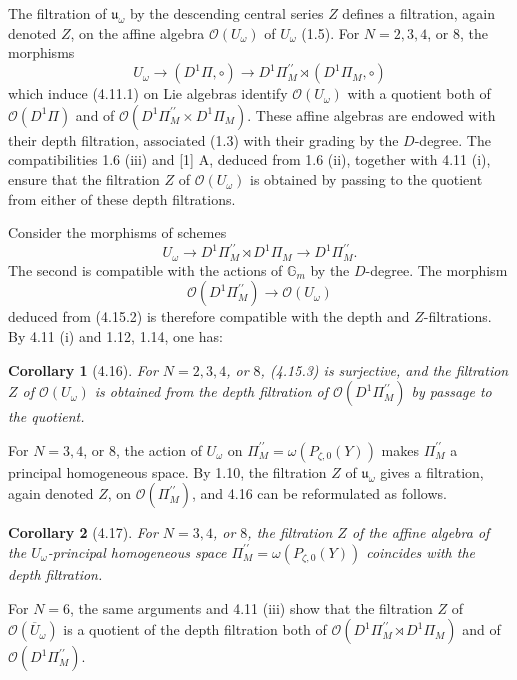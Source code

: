 \documentclass[10pt,a4paper]{article}
\newcommand{\Gm}{\mathbb G_m}
\newcommand{\OO}{\mathcal O}
\newcommand{\uomega}{\mathfrak u_\omega}
\theoremstyle{deligne}
\newtheorem*{corollary*}{Corollary}
\newcommand{\heading}[1]{\vspace{0.65em}\noindent{\bfseries #1}\quad}
\begin{document}
\heading{4.15.} The filtration of \(\uomega\) by the descending central series \(Z\) defines a filtration, again denoted \(Z\), on the affine algebra \(\OO(U_\omega)\) of \(U_\omega\) (1.5). For \(N=2,3,4\), or \(8\), the morphisms
\[
\tag{4.15.1}
U_\omega\longrightarrow(D^1\Pi,\circ)\longrightarrow D^1\Pi_M^{\prime\prime}\rtimes(D^1\Pi_M,\circ)
\]
which induce (4.11.1) on Lie algebras identify \(\OO(U_\omega)\) with a quotient both of \(\OO(D^1\Pi)\) and of \(\OO(D^1\Pi_M^{\prime\prime}\times D^1\Pi_M)\). These affine algebras are endowed with their depth filtration, associated (1.3) with their grading by the \(D\)-degree. The compatibilities 1.6 (iii) and [1] A, deduced from 1.6 (ii), together with 4.11 (i), ensure that the filtration \(Z\) of \(\OO(U_\omega)\) is obtained by passing to the quotient from either of these depth filtrations.

Consider the morphisms of schemes
\[
\tag{4.15.2}
U_\omega\longrightarrow D^1\Pi_M^{\prime\prime}\rtimes D^1\Pi_M\longrightarrow D^1\Pi_M^{\prime\prime}.
\]
The second is compatible with the actions of \(\Gm\) by the \(D\)-degree. The morphism
\[
\tag{4.15.3}
\OO(D^1\Pi_M^{\prime\prime})\longrightarrow \OO(U_\omega)
\]
deduced from (4.15.2) is therefore compatible with the depth and \(Z\)-filtrations. By 4.11 (i) and 1.12, 1.14, one has:

\begin{corollary*}[4.16]
For \(N=2,3,4\), or \(8\), (4.15.3) is surjective, and the filtration \(Z\) of \(\OO(U_\omega)\) is obtained from the depth filtration of \(\OO(D^1\Pi_M^{\prime\prime})\) by passage to the quotient.
\end{corollary*}

For \(N=3,4\), or \(8\), the action of \(U_\omega\) on \(\Pi_M^{\prime\prime}=\omega(P_{\zeta,0}(Y))\) makes \(\Pi_M^{\prime\prime}\) a principal homogeneous space. By 1.10, the filtration \(Z\) of \(\uomega\) gives a filtration, again denoted \(Z\), on \(\OO(\Pi_M^{\prime\prime})\), and 4.16 can be reformulated as follows.

\begin{corollary*}[4.17]
For \(N=3,4\), or \(8\), the filtration \(Z\) of the affine algebra of the \(U_\omega\)-principal homogeneous space \(\Pi_M^{\prime\prime}=\omega(P_{\zeta,0}(Y))\) coincides with the depth filtration.
\end{corollary*}

\heading{4.18.} For \(N=6\), the same arguments and 4.11 (iii) show that the filtration \(Z\) of \(\OO(\overline U_\omega)\) is a quotient of the depth filtration both of \(\OO(D^1\Pi_M^{\prime\prime}\rtimes D^1\Pi_M)\) and of \(\OO(D^1\Pi_M^{\prime\prime})\).
\end{document}
